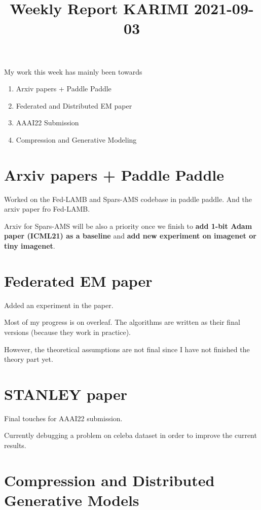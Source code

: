 \documentclass{article}
\begin{document}
\title{Weekly Report KARIMI 2021-09-03}


\date{}
\maketitle

\vspace{-0.5in}

My work this week has mainly been towards
\begin{enumerate}
\item Arxiv papers + Paddle Paddle
\item Federated and Distributed EM paper
\item AAAI22 Submission
\item Compression and Generative Modeling
\end{enumerate}



\section{Arxiv papers + Paddle Paddle}
Worked on the Fed-LAMB and Spars-AMS codebase in paddle paddle.
And the arxiv paper fro Fed-LAMB.

Arxiv for Spars-AMS will be also a priority once we finish to \textbf{add 1-bit Adam paper (ICML21) as a baseline} and \textbf{add new experiment on imagenet or tiny imagenet}.

\section{Federated EM paper}

Added an experiment in the paper.

Most of my progress is on overleaf. The algorithms are written as their final versions (because they work in practice).

However, the theoretical assumptions are not final since I have not finished the theory part yet.


\section{STANLEY paper}
Final touches for AAAI22 submission.

Currently debugging a problem on celeba dataset in order to improve the current results.


\section{Compression and Distributed Generative Models}
\end{document}
